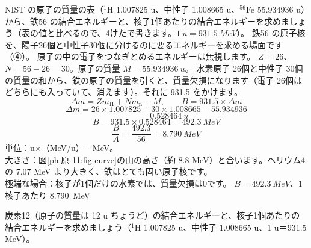 \label{ph:原-11:ex2}
\begin{phreidai}
NIST の原子の質量の表（${}^1$H 1.007825 u、中性子 1.008665 u、${}^{56}$Fe 55.934936 u）から、鉄56 の結合エネルギーと、核子1個あたりの結合エネルギーを求めましょう（表の値と比べるので、4けたで書きます。$\qty{1}{u}=\qty{931.5}{MeV}$）。
\phbamen
鉄56 の原子核を、陽子26個と中性子30個に分けるのに要るエネルギーを求める場面です（④）。
\phmushi
原子の中の電子をつなぎとめるエネルギーは無視します。
\phzu
$Z=26$、$N=56-26=30$。原子の質量 $M=\qty{55.934936}{u}$。
\phriyu
水素原子 26個と中性子 30個の質量の和から、鉄の原子の質量を引くと、質量欠損になります（電子 26個はどちらにも入っていて、消えます）。それに 931.5 をかけます。
\phtateru
\[ \Delta m=Zm_{\mathrm H}+Nm_{\mathrm n}-M,\qquad B=931.5\times\Delta m \]
\phtoku
\[ \Delta m=26\times1.007825+30\times1.008665-55.934936 \]
\[ \phantom{\Delta m}=\qty{0.528464}{u} \]
\[ B=931.5\times0.528464=\qty{492.3}{MeV} \]
\[ \frac{B}{A}=\frac{492.3}{56}=\qty{8.790}{MeV} \]
\phtashikame
単位：u×（MeV/u）＝MeV。\\
大きさ：図\ref{ph:原-11:fig-curve}の山の高さ（約 8.8 MeV）と合います。ヘリウム4 の 7.07 MeV より大きく、鉄はとても固い原子核です。\\
極端な場合：核子が1個だけの水素では、質量欠損は0です。
\kotae $B=\qty{492.3}{MeV}$、1核子あたり \qty{8.790}{MeV}
\end{phreidai}
\begin{jibun}
炭素12（原子の質量は 12 u ちょうど）の結合エネルギーと、核子1個あたりの結合エネルギーを求めましょう（${}^1$H 1.007825 u、中性子 1.008665 u、1 u＝931.5 MeV）。
\end{jibun}

